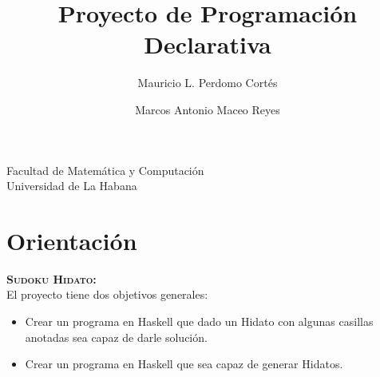 \documentclass[12pt]{article}
\title{Proyecto de Programaci\'on Declarativa}
\author{Mauricio L. Perdomo Cort\'es \and Marcos Antonio Maceo Reyes}
\begin{document}
\vspace{8.cm}

\maketitle

\begin{center}
    Facultad de Matem\'atica y Computaci\'on\\\vspace{0.2cm} Universidad de La Habana
\end{center}

\clearpage

\newpage

\section{Orientaci\'on}
\raggedright
\textsc{\textbf{Sudoku Hidato:}}\\\vspace{0.5cm}
El proyecto tiene dos objetivos generales:
\begin{itemize}
	\item Crear un programa en Haskell que dado un Hidato con algunas casillas anotadas sea capaz de darle soluci\'on.
	\item Crear un programa en Haskell que sea capaz de generar Hidatos.	
\end{itemize}



\raggedright
\end{document}

